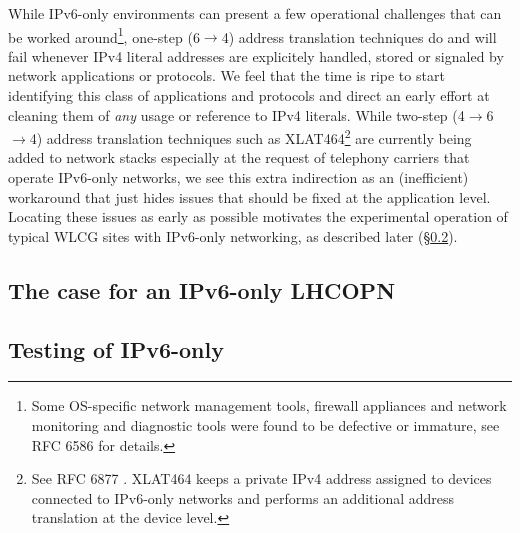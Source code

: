 While IPv6-only environments can present a few operational challenges that
can be worked around\footnote{Some OS-specific network management tools,
firewall appliances and network monitoring and diagnostic tools were found
to be defective or immature, see RFC 6586 \cite{rfc} for details.},
one-step (6$\rightarrow$4) address translation techniques do and will fail whenever 
IPv4 literal addresses are explicitely handled, stored or signaled by
network applications or protocols. We feel that the time is ripe to
start identifying this class of applications and protocols and direct an early effort
at cleaning them of {\it any} usage or reference to IPv4 literals. While 
two-step (4$\rightarrow$6$\rightarrow$4) address translation techniques
such as XLAT464\footnote{See RFC 6877 \cite{rfc}. XLAT464 keeps a private
IPv4 address assigned to devices connected to IPv6-only networks and
performs an additional address translation at the device level.}
are currently being added to 
network stacks especially at the request of telephony carriers that operate
IPv6-only networks, we see this extra indirection as an (inefficient)
workaround that just hides issues that should be fixed at the application
level. Locating these issues as early as possible motivates the experimental
operation of typical
WLCG sites with IPv6-only networking, as described
later (\S \ref{ssec:ipv6onlytest}).

\subsection{The case for an IPv6-only LHCOPN}


\subsection{Testing of IPv6-only}
\label{ssec:ipv6onlytest}


